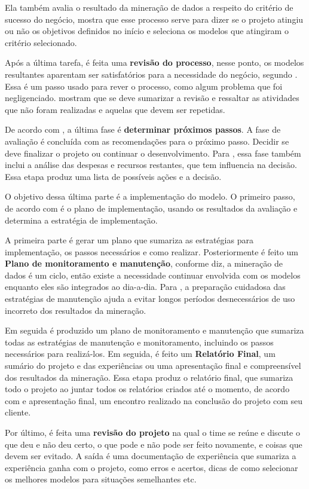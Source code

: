 Ela também avalia o resultado da mineração de dados a respeito do critério de sucesso do negócio,  mostra que esse processo serve para dizer se o projeto atingiu ou não os objetivos definidos no início e seleciona os modelos que atingiram o critério selecionado.

Após a última tarefa, é feita uma \textbf{revisão do processo}, nesse ponto, os modelos resultantes aparentam ser satisfatórios para a necessidade do negócio, segundo \citep{crispmanual}. Essa é um passo usado para rever o processo, como algum problema que foi negligenciado.  mostram que se deve sumarizar a revisão e ressaltar as atividades que não foram realizadas e aquelas que devem ser repetidas.

De acordo com , a última fase é \textbf{determinar próximos passos}. A fase de avaliação é concluída com as recomendações para o próximo passo. Decidir se deve finalizar o projeto ou continuar o desenvolvimento. Para , essa fase também inclui a análise das despesas e recursos restantes, que tem influencia na decisão.
Essa etapa produz uma lista de possíveis ações e a decisão.

O objetivo dessa última parte é a implementação do modelo.
O primeiro passo, de acordo com  é o plano de implementação, usando os resultados da avaliação e determina a estratégia de implementação. 

A primeira parte é gerar um plano que sumariza as estratégias para implementação, os passos necessários e como realizar.
Posteriormente é feito um \textbf{Plano de monitoramento e manutenção}, conforme  diz, a mineração de dados é um ciclo, então existe a necessidade continuar envolvida com os modelos enquanto eles são integrados ao dia-a-dia. Para , a preparação cuidadosa das estratégias de manutenção ajuda a evitar longos períodos desnecessários de uso incorreto dos resultados da mineração.

Em seguida é produzido um plano de monitoramento e manutenção que sumariza todas as estratégias de manutenção e monitoramento, incluindo os passos necessários para realizá-los.
Em seguida, é feito um \textbf{Relatório Final}, um sumário do projeto e das experiências ou uma apresentação final e compreensível dos resultados da mineração.
Essa etapa produz o relatório final, que sumariza todo o projeto ao juntar todos os relatórios criados até o momento, de acordo com  e apresentação final, um encontro realizado na conclusão do projeto com seu cliente.

Por último, é feita uma \textbf{revisão do projeto} na qual o time se reúne e discute o que deu e não deu certo, o que pode e não pode ser feito novamente, e coisas que devem ser evitado.
A saída é uma documentação de experiência que sumariza a experiência ganha com o projeto, como erros e acertos, dicas de como selecionar os melhores modelos para situações semelhantes etc.
